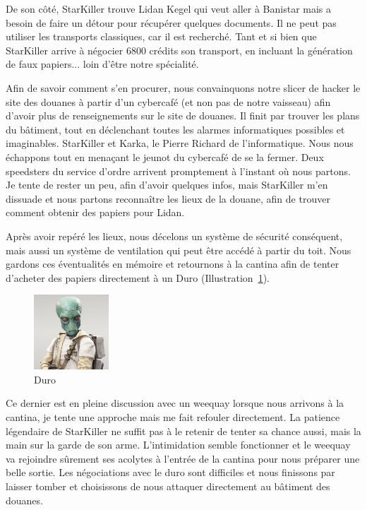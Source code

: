 \documentclass[a4paper,9pt,twoside,twocolumn,openany]{book}
\begin{document}
De son côté, StarKiller trouve Lidan Kegel qui veut aller à Banistar mais a besoin de faire un détour pour récupérer quelques documents. Il ne peut pas utiliser les transports classiques, car il est recherché. Tant et si bien que StarKiller arrive à négocier 6800 crédits son transport, en incluant la génération de faux papiers... loin d’être notre spécialité.

Afin de savoir comment s’en procurer, nous convainquons notre slicer de hacker le site des douanes à partir d’un cybercafé (et non pas de notre vaisseau) afin d'avoir plus de renseignements sur le site de douanes. Il finit par trouver les plans du bâtiment, tout en déclenchant toutes les alarmes informatiques possibles et imaginables. StarKiller et Karka, le Pierre Richard de l'informatique. Nous nous échappons tout en menaçant le jeunot du cybercafé de se la fermer. Deux speedsters du service d’ordre arrivent promptement à l'instant où nous partons. Je tente de rester un peu, afin d’avoir quelques infos, mais StarKiller m’en dissuade et nous partons reconnaître les lieux de la douane, afin de trouver comment obtenir des papiers pour Lidan.

Après avoir repéré les lieux, nous décelons un système de sécurité conséquent, mais aussi un système de ventilation qui peut être accédé à partir du toit. Nous gardons ces éventualités en mémoire et retournons à la cantina afin de tenter d’acheter des papiers directement à un Duro (Illustration~\ref{duro}).

\begin{figure}
    \includegraphics[width=0.25\textwidth]{img/duro.jpg}
    \caption{Duro}
    \label{duro}
\end{figure}

Ce dernier est en pleine discussion avec un weequay lorsque nous arrivons à la cantina, je tente une approche mais me fait refouler directement. La patience légendaire de StarKiller ne suffit pas à le retenir de tenter sa chance aussi, mais la main sur la garde de son arme. L’intimidation semble fonctionner et le weequay va rejoindre sûrement ses acolytes à l'entrée de la cantina pour nous préparer une belle sortie. Les négociations avec le duro sont difficiles et nous finissons par laisser tomber et choisissons de nous attaquer directement au bâtiment des douanes.
\end{document}
